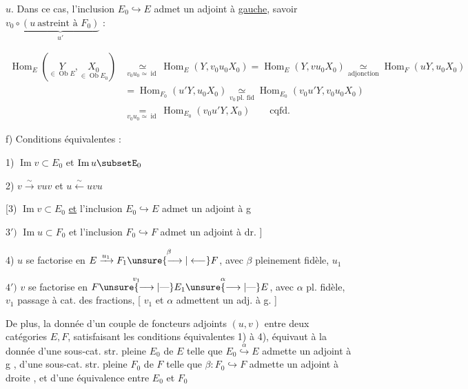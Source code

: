 
$u$. Dans ce cas, l'inclusion $E_0\hookrightarrow E$ admet un adjoint à \uline{gauche}, savoir $v_0\circ\underbrace{(u\ \text{astreint à }F_0)}_{u'}$ :

\[
\begin{aligned}
\operatorname{Hom}_{E}(\underset{\in\operatorname{Ob}E}{Y},\underset{\in\operatorname{Ob}E_0}{X_0})
&\underset{v_0u_0\simeq\operatorname{id}}{\simeq}\operatorname{Hom}_{E}(Y,v_0u_0X_0)=\operatorname{Hom}_{E}(Y,vu_0X_0)\underset{\text{adjonction}}{\simeq}\operatorname{Hom}_{F}(uY,u_0X_0)\\
&=\operatorname{Hom}_{F_0}(u'Y,u_0X_0)\underset{v_0\,\text{pl. fid}}{\simeq}\operatorname{Hom}_{E_0}(v_0u'Y,v_0u_0X_0)\\
&\underset{v_0u_0\simeq\operatorname{id}}{=}\operatorname{Hom}_{E_0}(v_0u'Y,X_0)\qquad\text{cqfd.}
\end{aligned}
\]

f) Conditions équivalentes :

1) $\operatorname{Im}v\subset E_0$ et  $\operatorname{Im}u\subsetE_0$

2) $v\xrightarrow{\sim}vuv$ et  $u\xleftarrow{\sim}uvu$

[3)  $\operatorname{Im}v\subset E_0$ \uline{et} l'inclusion $E_0\hookrightarrow E$ admet un adjoint à g

$3')$ $\operatorname{Im}u\subset F_0$ et l'inclusion $F_0\hookrightarrow F$ admet un adjoint à dr. ]


4) $u$ se factorise en $E\xrightarrow{u_1}F_1\overset{\beta}{\unsure{\longrightarrow|\longleftarrow}}F$, avec $\beta$ pleinement fidèle, $u_1$ 

$4')$ $v$ se factorise en $F\overset{v_1}{\unsure{\longrightarrow|\text{---}}} E_1\overset{\alpha}{\unsure{\longrightarrow|\text{---}}}E$, avec $\alpha$ pl. fidèle, $v_1$ passage à cat. des fractions, [ $v_1$ et $\alpha$ admettent un adj. à g. ]

De  plus, la donnée d'un couple de foncteurs adjoints $(u,v)$ entre deux catégories $E,F$, satisfaisant les conditions équivalentes 1) à 4), équivaut à la donnée d'une sous-cat. str. pleine $E_0$ de $E$ telle que $E_0\overset{\alpha}{\hookrightarrow}E$ admette un adjoint à g , d'une sous-cat. str. pleine $F_0$ de $F$ telle que $\beta:F_0\hookrightarrow F$ admette un adjoint à droite , et d'une équivalence entre $E_0$ et $F_0$


